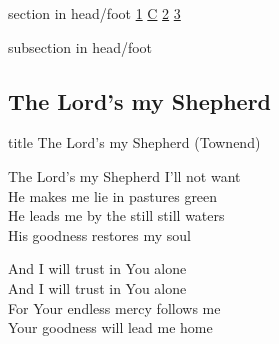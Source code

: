 \documentclass{beamer}
\begin{document}
{
{ 
 {
 \begin{beamercolorbox}[ht=4.5ex,dp=1.5ex,%
      leftskip=.3cm,rightskip=.3cm plus1fil]{section in head/foot}
 \fontsize{12}{25}\selectfont 
\hyperlink{The Lord's my Shepherd['Psalm 23'](Townend)1}{1}
\hyperlink{The Lord's my Shepherd['Psalm 23'](Townend)C}{C}
\hyperlink{The Lord's my Shepherd['Psalm 23'](Townend)2}{2}
\hyperlink{The Lord's my Shepherd['Psalm 23'](Townend)3}{3}
 
 \end{beamercolorbox}%
  \begin{beamercolorbox}[ht=2.5ex,dp=1.125ex,%
   leftskip=.3cm,rightskip=.3cm plus1fil]{subsection in head/foot}
   \insertauthor
 \end{beamercolorbox}%
 }
}
\subsection{ The Lord's my Shepherd }

\hypertarget{The Lord's my Shepherd['Psalm 23'](Townend)}{}
\begin{frame}{}
 \vfill
  \centering
  \begin{beamercolorbox}[sep=8pt,center,shadow=true,rounded=true]{title}
    The Lord's my Shepherd (Townend)    
  \end{beamercolorbox}
  \vfill
\end{frame}

\hypertarget{The Lord's my Shepherd['Psalm 23'](Townend)1}{}
\begin{frame}{}
\fontsize{ 20 }{ 27 }\selectfont

The Lord's my Shepherd I'll not want\\ 
He makes me lie in pastures green\\ 
He leads me by the still still waters\\ 
His goodness restores my soul 

\end{frame}

\hypertarget{The Lord's my Shepherd['Psalm 23'](Townend)C}{}
\begin{frame}{}
\fontsize{ 20 }{ 27 }\selectfont

And I will trust in You alone\\ 
And I will trust in You alone\\ 
For Your endless mercy follows me\\ 
Your goodness will lead me home 


\end{frame}}
\end{document}
